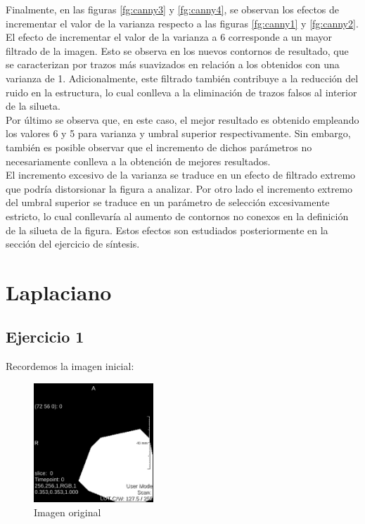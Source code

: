 \documentclass{article}
\begin{document}
Finalmente, en las figuras \ref{fg:canny3} y \ref{fg:canny4}, se observan los efectos de incrementar el valor de la varianza respecto a las figuras \ref{fg:canny1} y \ref{fg:canny2}. El efecto de incrementar el valor de la varianza a 6 corresponde a un mayor filtrado de la imagen. Esto se observa en los nuevos contornos de resultado, que se caracterizan por trazos más suavizados en relación a los obtenidos con una varianza de 1. Adicionalmente, este filtrado también contribuye a la reducción del ruido en la estructura, lo cual conlleva a la eliminación de trazos falsos al interior de la silueta. \\
Por último se observa que, en este caso, el mejor resultado es obtenido empleando los valores 6 y 5 para varianza y umbral superior respectivamente. Sin embargo, también es posible observar que el incremento de dichos parámetros no necesariamente conlleva a la obtención de mejores resultados. \\
El incremento excesivo de la varianza se traduce en un efecto de filtrado extremo que podría distorsionar la figura a analizar. Por otro lado el incremento extremo del umbral superior se traduce en un parámetro de selección excesivamente estricto, lo cual conllevaría al aumento de contornos no conexos en la definición de la silueta de la figura. Estos efectos son estudiados posteriormente en la sección del ejercicio de síntesis.


\section{Laplaciano}

\subsection{Ejercicio 1}

Recordemos la imagen inicial:

\begin{figure}[ht]
\begin{center}
    \includegraphics[width=0.4\textwidth]{3Laplaciano/3_spot_orig.png} %
    \caption{Imagen original}
\label{fg:spot_orig}
\end{center}
\end{figure}
\FloatBarrier
\end{document}
